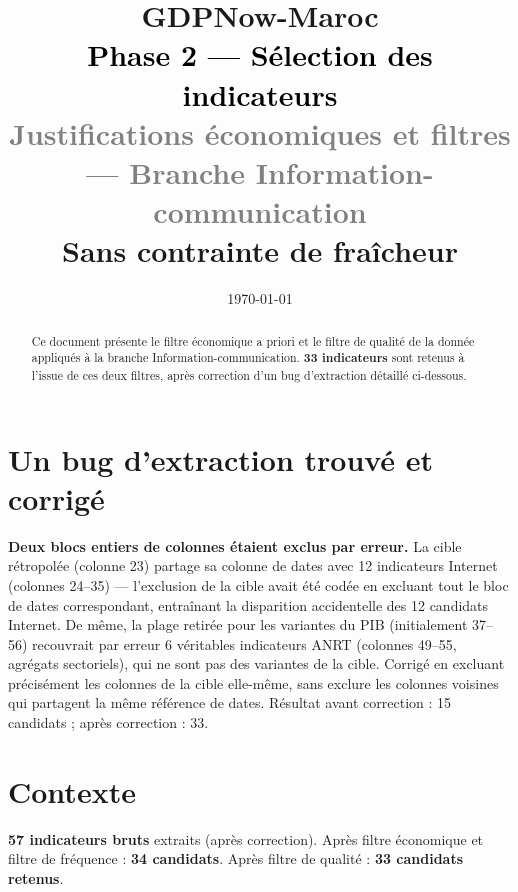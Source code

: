 \documentclass[11pt,a4paper]{article}
\title{\vspace{-1.3cm}\textcolor{bleuprincip}{\Huge\bfseries GDPNow-Maroc}\\[0.3cm]
\textcolor{black}{\Large Phase 2 --- Sélection des indicateurs}\\[0.15cm]
\textcolor{gray}{\large Justifications économiques et filtres --- Branche Information-communication}\\[0.1cm]
\textcolor{orangealerte}{\normalsize Sans contrainte de fraîcheur}}
\author{}
\date{\today}
\begin{document}
\maketitle
\thispagestyle{empty}

\begin{abstract}
\noindent Ce document présente le filtre économique a priori et le filtre de qualité de la donnée appliqués à la branche Information-communication. \textbf{33 indicateurs} sont retenus à l'issue de ces deux filtres, après correction d'un bug d'extraction détaillé ci-dessous.
\end{abstract}

\tableofcontents
\vspace{0.3cm}

\section{Un bug d'extraction trouvé et corrigé}

\begin{alertebox}
\textbf{Deux blocs entiers de colonnes étaient exclus par erreur.} La cible rétropolée (colonne 23) partage sa colonne de dates avec 12 indicateurs Internet (colonnes 24--35) --- l'exclusion de la cible avait été codée en excluant tout le bloc de dates correspondant, entraînant la disparition accidentelle des 12 candidats Internet. De même, la plage retirée pour les variantes du PIB (initialement 37--56) recouvrait par erreur 6 véritables indicateurs ANRT (colonnes 49--55, agrégats sectoriels), qui ne sont pas des variantes de la cible. Corrigé en excluant précisément les colonnes de la cible elle-même, sans exclure les colonnes voisines qui partagent la même référence de dates. Résultat avant correction : 15 candidats ; après correction : 33.
\end{alertebox}

\section{Contexte}

\begin{fichebox}
\textbf{57 indicateurs bruts} extraits (après correction). Après filtre économique et filtre de fréquence : \textbf{34 candidats}. Après filtre de qualité : \textbf{33 candidats retenus}.
\end{fichebox}
\end{document}
